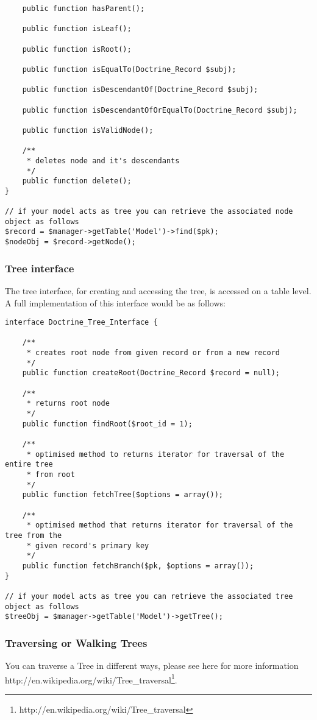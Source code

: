 \documentclass[11pt,a4paper]{report}
\begin{document}
\begin{verbatim}
    public function hasParent();

    public function isLeaf();

    public function isRoot();

    public function isEqualTo(Doctrine_Record $subj);

    public function isDescendantOf(Doctrine_Record $subj);

    public function isDescendantOfOrEqualTo(Doctrine_Record $subj);

    public function isValidNode();

    /**
     * deletes node and it's descendants
     */
    public function delete();
}

// if your model acts as tree you can retrieve the associated node object as follows
$record = $manager->getTable('Model')->find($pk);
$nodeObj = $record->getNode();
\end{verbatim}

\subsubsection{Tree interface}
The tree interface, for creating and accessing the tree, is accessed on a table level. A full implementation of this interface would be as follows:

\begin{verbatim}
interface Doctrine_Tree_Interface {

    /**
     * creates root node from given record or from a new record
     */
    public function createRoot(Doctrine_Record $record = null);

    /**
     * returns root node
     */
    public function findRoot($root_id = 1);

    /**
     * optimised method to returns iterator for traversal of the entire tree
     * from root
     */
    public function fetchTree($options = array());

    /**
     * optimised method that returns iterator for traversal of the tree from the
     * given record's primary key
     */
    public function fetchBranch($pk, $options = array());
}

// if your model acts as tree you can retrieve the associated tree object as follows
$treeObj = $manager->getTable('Model')->getTree();
\end{verbatim}

\subsubsection{Traversing or Walking Trees}
You can traverse a Tree in different ways, please see here for more information http://en.wikipedia.org/wiki/Tree\_traversal\footnote{http://en.wikipedia.org/wiki/Tree\_traversal}.
\end{document}
